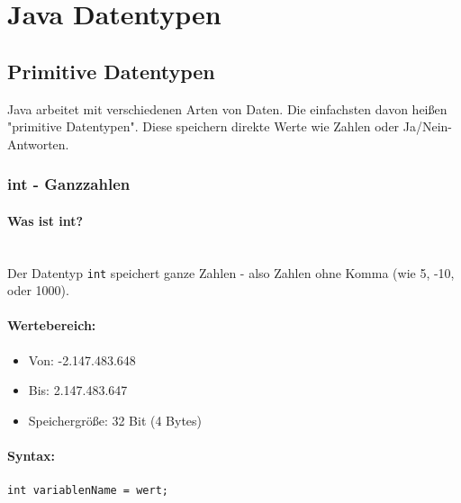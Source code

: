 \begingroup
\let\cleardoublepage\relax


\chapter*{Java Datentypen}
\label{ch:java-datentypen}
\endgroup


\section*{Primitive Datentypen}

Java arbeitet mit verschiedenen Arten von Daten. Die einfachsten davon heißen "primitive Datentypen".
Diese speichern direkte Werte wie Zahlen oder Ja/Nein-Antworten.

\newpage


\subsection*{int - Ganzzahlen}

\subsubsection*{Was ist int?}\\
Der Datentyp \texttt{int} speichert ganze Zahlen - also Zahlen ohne Komma (wie 5, -10, oder 1000).

\subsubsection*{Wertebereich:}
\begin{itemize}
	\item Von: -2.147.483.648
	\item Bis: 2.147.483.647
	\item Speichergröße: 32 Bit (4 Bytes)
\end{itemize}

\subsubsection*{Syntax:}
\begin{lstlisting}
int variablenName = wert;
\end{lstlisting}

